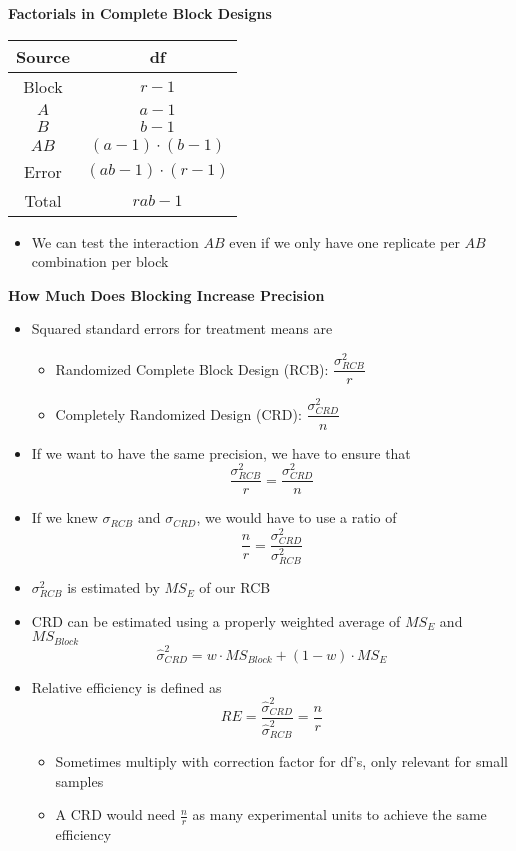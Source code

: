 \documentclass[a4paper]{article}
\begin{document}
\textbf{Factorials in Complete Block Designs}
\begin{table}[!htbp]
    \centering
    \begin{tabular}{c|c}
    \textbf{Source} & \textbf{df} \\
    \hline
    Block & $r-1$ \\
    \hline
    $A$ & $a-1$ \\
    \hline
    $B$ & $b-1$ \\
    \hline
    $AB$ & $(a-1)\cdot(b-1)$ \\
    \hline
    Error & $(ab-1)\cdot(r-1)$ \\
    \hline
    Total & $rab-1$
    \end{tabular}
\end{table}
\begin{itemize}
    \item We can test the interaction $AB$ even if we only have one replicate per $AB$ combination per block
\end{itemize}

\textbf{How Much Does Blocking Increase Precision}
\begin{itemize}
    \item Squared standard errors for treatment means are
    \begin{itemize}
        \item Randomized Complete Block Design (RCB): $\dfrac{\sigma_{RCB}^2}{r}$
        \item Completely Randomized Design (CRD): $\dfrac{\sigma_{CRD}^2}{n}$
    \end{itemize}
    \item If we want to have the same precision, we have to ensure that
    \[\dfrac{\sigma_{RCB}^2}{r}=\dfrac{\sigma_{CRD}^2}{n} \]
    \item If we knew $\sigma_{RCB}$ and $\sigma_{CRD}$, we would have to use a ratio of
    \[\frac{n}{r}=\frac{\sigma_{CRD}^2}{\sigma_{RCB}^2} \]
    \item $\sigma_{RCB}^2$ is estimated by $MS_E$ of our RCB
    \item CRD can be estimated using a properly weighted average of $MS_E$ and $MS_{Block}$
    \[\hat{\sigma}_{CRD}^2=w\cdot MS_{Block}+(1-w)\cdot MS_E \]
    \item Relative efficiency is defined as
    \[RE=\frac{\hat{\sigma}_{CRD}^2}{\hat{\sigma}_{RCB}^2}=\frac{n}{r} \]
    \begin{itemize}
        \item Sometimes multiply with correction factor for df's, only relevant for small samples
        \item A CRD would need $\frac{n}{r}$ as many experimental units to achieve the same efficiency 
    \end{itemize}
\end{itemize}
\end{document}
